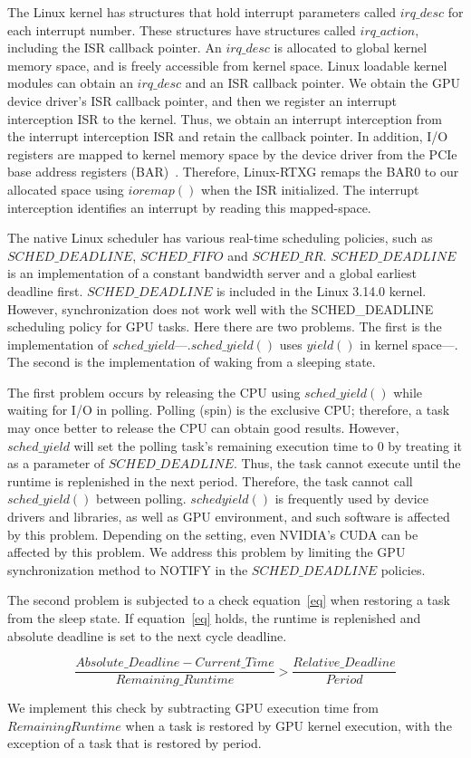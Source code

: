 The Linux kernel has structures that hold interrupt parameters called $irq\_desc$ for each interrupt number.
These structures have structures called $irq\_action$, including the ISR callback pointer.
An $irq\_desc$ is allocated to global kernel memory space, and is freely accessible from kernel space.
Linux loadable kernel modules can obtain an $irq\_desc$ and an ISR callback pointer.
We obtain the GPU device driver's ISR callback pointer, and then we register an interrupt interception ISR to the kernel.
Thus, we obtain an interrupt interception from the interrupt interception ISR and retain the callback pointer.
In addition, I/O registers are mapped to kernel memory space by the device driver from the PCIe base address registers (BAR)~\cite{fujii:icpads2013,kato2013zero}.
Therefore, Linux-RTXG remaps the BAR0 to our allocated space using $ioremap()$ when the ISR initialized.
The interrupt interception identifies an interrupt by reading this mapped-space.

The native Linux scheduler has various real-time scheduling policies, such as $SCHED\_DEADLINE$, $SCHED\_FIFO$ and $SCHED\_RR$.
$SCHED\_DEADLINE$ is an implementation of a constant bandwidth server and a global earliest deadline first.
$SCHED\_DEADLINE$ is included in the Linux 3.14.0 kernel.
However, synchronization does not work well with the SCHED\_DEADLINE scheduling policy for GPU tasks.
Here there are two problems.
The first is the implementation of $sched\_yield$---.$sched\_yield()$ uses $yield()$ in kernel space---.
The second is the implementation of waking from a sleeping state.

The first problem occurs by releasing the CPU using $sched\_yield()$ while waiting for I/O in polling.
Polling (spin) is the exclusive CPU; therefore, a task may once better to release the CPU can obtain good results.
However, $sched\_yield$ will set the polling task's remaining execution time to 0 by treating it as a parameter of $SCHED\_DEADLINE$.
Thus, the task cannot execute until the runtime is replenished in the next period.
Therefore, the task cannot call $sched\_yield()$ between polling.
$sched yield()$ is frequently used by device drivers and libraries, as well as GPU environment, and such software is affected by this problem.
Depending on the setting, even NVIDIA's CUDA can be affected by this problem.
We address this problem by limiting the GPU synchronization method to NOTIFY in the $SCHED\_DEADLINE$ policies.

The second problem is subjected to a check equation~\ref{eq} when restoring a task from the sleep state.
If equation~\ref{eq} holds, the runtime is replenished and absolute deadline is set to the next cycle deadline.

{\scriptsize
\begin{equation}
\frac{Absolute\_Deadline - Current\_Time}{Remaining\_Runtime} > \frac{Relative\_Deadline}{Period} \label{eq}
\end{equation}
}

We implement this check by subtracting GPU execution time from $Remaining Runtime$ when a task is restored by GPU kernel execution, with the exception of a task that is restored by period.
